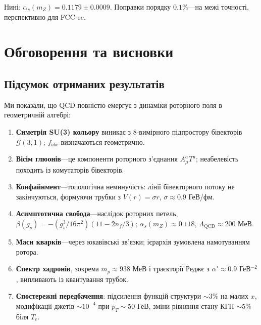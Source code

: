 \documentclass[11pt,a4paper]{article}
\newcommand{\Cl}{\mathcal{G}}
\theoremstyle{definition}
\theoremstyle{plain}
\theoremstyle{remark}
\begin{document}
Нині: $\alpha_s(m_Z)=0{.}1179\pm 0{.}0009$. Поправки порядку $0{.}1\%$—на межі точності, перспективно для FCC-ee.

\vspace{1em}

\section{Обговорення та висновки}
\label{sec:discussion}

\subsection{Підсумок отриманих результатів}

Ми показали, що QCD повністю емергує з динаміки роторного поля в геометричній алгебрі:

\begin{enumerate}[leftmargin=*,itemsep=3pt]
  \item \textbf{Симетрія SU(3) кольору} виникає з 8-вимірного підпростору бівекторів $\Cl(3,1)$; $f_{abc}$ визначаються геометрично.

  \item \textbf{Вісім глюонів}—це компоненти роторного з’єднання $A_\mu^aT^a$; неабелевість походить із комутаторів бівекторів.

  \item \textbf{Конфайнмент}—топологічна неминучість: лінії бівекторного потоку не закінчуються, формуючи трубки з $V(r)=\sigma r$, $\sigma\approx 0{.}9$ ГеВ/фм.

  \item \textbf{Асимптотична свобода}—наслідок роторних петель, $\beta(g_s)=-(g_s^3/16\pi^2)(11-2n_f/3)$; $\alpha_s(m_Z)\approx 0{.}118$, $\Lambda_{\mathrm{QCD}}\approx 200$ МеВ.

  \item \textbf{Маси кварків}—через юкавівські зв’язки; ієрархія зумовлена намотуванням ротора.

  \item \textbf{Спектр хадронів}, зокрема $m_p\approx 938$ МеВ і траєкторії Реджє з $\alpha'\approx 0{.}9$ ГеВ$^{-2}$, випливають із квантування трубок.

  \item \textbf{Спостережні передбачення}: підсилення функцій структури $\sim 3\%$ на малих $x$, модифікації джетів $\sim 10^{-4}$ при $p_T\sim 50$ ГеВ, зміни рівняння стану КГП $\sim 5\%$ біля $T_c$.
\end{enumerate}
\end{document}
